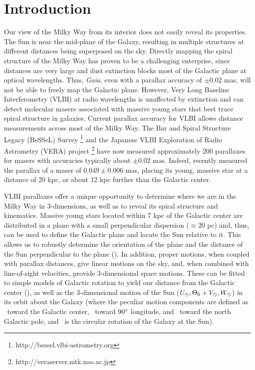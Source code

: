\documentclass[12pt,preprint]{aastex}
\def\deg  {\ifmmode {^\circ}\else {$^\circ$}\fi}
\def\V     {\ifmmode {V_\odot}\else {$V_\odot$}\fi}
\def\U     {\ifmmode {U_\odot}\else {$U_\odot$}\fi}
\def\W     {\ifmmode {W_\odot}\else {$W_\odot$}\fi}
\def\To    {\ifmmode{\Theta_0}\else{$\Theta_0$}\fi}
\def\Ro    {\ifmmode{R_0}\else{$R_0$}\fi}
\def\Zsun  {\ifmmode {Z_\odot}\else {$Z_\odot$}\fi}
\begin{document}
\section{Introduction}

Our view of the Milky Way from its interior does not easily reveal its
properties.  The Sun is near the mid-plane of the Galaxy, resulting
in multiple structures at different distances being superposed on the sky.
Directly mapping the spiral structure of the Milky Way has proven to be 
a challenging enterprise, since distances are very large and dust extinction 
blocks most of the Galactic plane at optical wavelengths.  Thus, {\it Gaia}, 
even with a parallax accuracy of $\pm0.02$ mas, will not be able to freely 
map the Galactic plane.  However, Very Long Baseline Interferometry (VLBI) at 
radio wavelengths is unaffected by extinction and can detect molecular masers 
associated with massive young stars that best trace spiral structure in galaxies.  
Current parallax accuracy for VLBI allows distance measurements across 
most of the Milky Way.  The Bar and Spiral Structure Legacy (BeSSeL) Survey
\footnote{http://bessel.vlbi-astrometry.org}
 and the Japanese VLBI Exploration of Radio Astrometry (VERA) project
\footnote{http://veraserver.mtk.nao.ac.jp}
have now measured approximately 200 parallaxes for masers with accuracies typically 
about $\pm0.02$ mas.  Indeed, recently \citet{Sanna17} measured the parallax
of a maser of $0.049\pm0.006$ mas, placing its young, massive star 
at a distance of 20 kpc, or about 12 kpc further than the Galactic center.

VLBI parallaxes offer a unique opportunity to determine where we are in the 
Milky Way in 3-dimensions, as well as to reveal its spiral structure and 
kinematics.  Massive young stars located within 7 kpc of the 
Galactic center are distributed in a plane with a small perpendicular dispersion
($\approx20$ pc) and, thus, can be used to define the Galactic plane and locate 
the Sun relative to it.  
This allows us to robustly determine the orientation of the plane and the 
distance of the Sun perpendicular to the plane (\Zsun).  
In addition, proper motions, when coupled with parallax distances, 
give linear motions on the sky, and, when combined with line-of-sight velocities, 
provide 3-dimensional space motions.   These can be fitted to simple models of 
Galactic rotation to yield our distance from the Galactic center (\Ro), as well 
as the 3-dimensional motion of the Sun ($\U,\To+\V,\W$) in its orbit about the 
Galaxy (where the peculiar motion components are defined as \U\ toward 
the Galactic center, \V\ toward $90\deg$ longitude, and \W\ toward the
north Galactic pole, and \To\ is the circular rotation of the Galaxy at the Sun).
\end{document}
